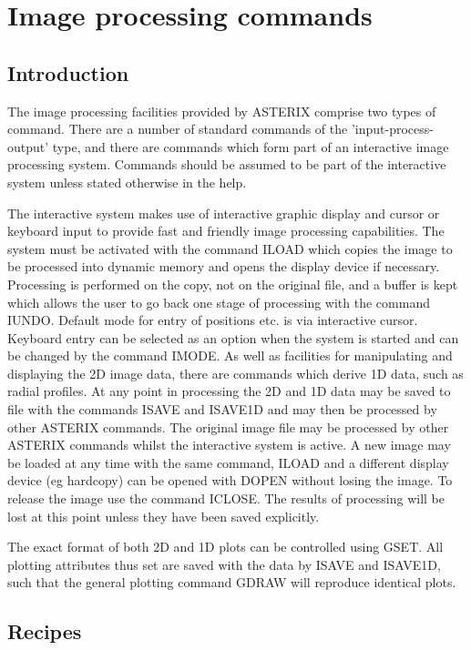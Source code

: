 \documentclass{book}
\renewcommand{\_}{{\tt\char'137}}     %
\begin{document}
\chapter{Image processing commands}
\section{Introduction}
The image processing facilities provided by ASTERIX comprise
two types of command. There are a number of standard commands
of the 'input-process-output' type, and there are commands
which form part of an interactive image processing system.
Commands should be assumed to be part of the interactive system
unless stated otherwise in the help.

The interactive system makes use of interactive graphic display
and cursor or keyboard input to provide fast and friendly image
processing capabilities. The system must be activated with the
command ILOAD which copies the image to be processed into dynamic
memory and opens the display device if necessary. Processing is
performed on the copy, not on the original file, and a buffer is
kept which allows the user to go back one stage of processing with
the command IUNDO. Default mode for entry of positions etc.
is via interactive cursor. Keyboard entry can be selected as
an option when the system is started and can be changed by the
command IMODE. As well as facilities for manipulating
and displaying the 2D image data, there are commands which
derive 1D data, such as radial profiles. At any point in
processing the 2D and 1D data may be saved to file with the
commands ISAVE and ISAVE1D and may then be processed by other
ASTERIX commands. The original image file may be processed
by other ASTERIX commands whilst the interactive system is
active. A new image may be loaded at any time with the same
command, ILOAD and a different display device (eg hardcopy)
can be opened with DOPEN without losing the image. To release
the image use the command ICLOSE. The results of processing will
be lost at this point unless they have been saved explicitly.

The exact format of both 2D and 1D plots can be controlled
using GSET. All plotting attributes thus set are saved with
the data by ISAVE and ISAVE1D, such that the general plotting
command GDRAW will reproduce identical plots.

\section{Recipes}
\end{document}
